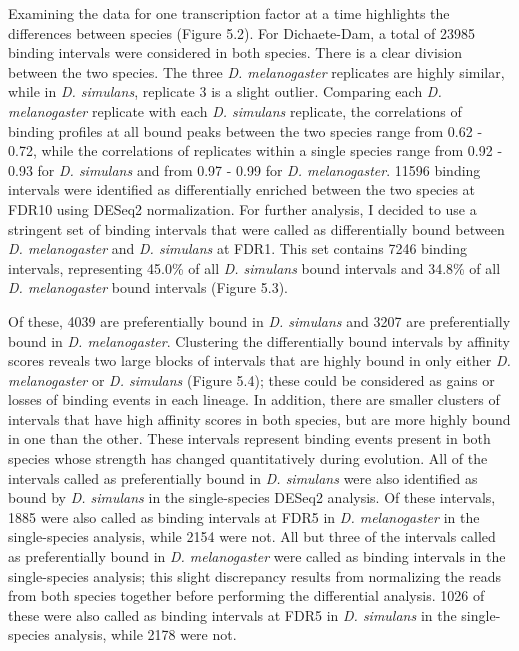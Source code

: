 Examining the data for one transcription factor at a time highlights the differences between species (Figure 5.2). For Dichaete-Dam, a total of 23985 binding intervals were considered in both species. There is a clear division between the two species. The three \emph{D. melanogaster} replicates are highly similar, while in \emph{D. simulans}, replicate 3 is a slight outlier. Comparing each \emph{D. melanogaster} replicate with each \emph{D. simulans} replicate, the correlations of binding profiles at all bound peaks between the two species range from 0.62 - 0.72, while the correlations of replicates within a single species range from 0.92 - 0.93 for \emph{D. simulans} and from 0.97 - 0.99 for \emph{D. melanogaster}. 11596 binding intervals were identified as differentially enriched between the two species at FDR10 using DESeq2 normalization. For further analysis, I decided to use a stringent set of binding intervals that were called as differentially bound between \emph{D. melanogaster} and \emph{D. simulans} at FDR1. This set contains 7246 binding intervals, representing 45.0\% of all \emph{D. simulans} bound intervals and 34.8\% of all \emph{D. melanogaster} bound intervals (Figure 5.3).

Of these, 4039 are preferentially bound in \emph{D. simulans} and 3207 are preferentially bound in \emph{D. melanogaster}. Clustering the differentially bound intervals by affinity scores reveals two large blocks of intervals that are highly bound in only either \emph{D. melanogaster} or \emph{D. simulans} (Figure 5.4); these could be considered as gains or losses of binding events in each lineage. In addition, there are smaller clusters of intervals that have high affinity scores in both species, but are more highly bound in one than the other. These intervals represent binding events present in both species whose strength has changed quantitatively during evolution. All of the intervals called as preferentially bound in \emph{D. simulans} were also identified as bound by \emph{D. simulans} in the single-species DESeq2 analysis. Of these intervals, 1885 were also called as binding intervals at FDR5 in \emph{D. melanogaster} in the single-species analysis, while 2154 were not. All but three of the intervals called as preferentially bound in \emph{D. melanogaster} were called as binding intervals in the single-species analysis; this slight discrepancy results from normalizing the reads from both species together before performing the differential analysis. 1026 of these were also called as binding intervals at FDR5 in \emph{D. simulans} in the single-species analysis, while 2178 were not.

